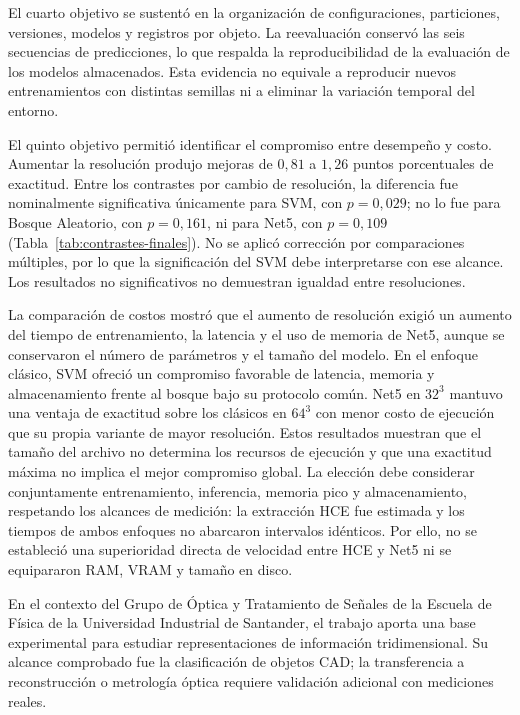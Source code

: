 El cuarto objetivo se sustentó en la organización de configuraciones, particiones, versiones, modelos y registros por objeto. La reevaluación conservó las seis secuencias de predicciones, lo que respalda la reproducibilidad de la evaluación de los modelos almacenados. Esta evidencia no equivale a reproducir nuevos entrenamientos con distintas semillas ni a eliminar la variación temporal del entorno.

El quinto objetivo permitió identificar el compromiso entre desempeño y costo. Aumentar la resolución produjo mejoras de $0{,}81$ a $1{,}26$ puntos porcentuales de exactitud. Entre los contrastes por cambio de resolución, la diferencia fue nominalmente significativa únicamente para SVM, con $p=0{,}029$; no lo fue para Bosque Aleatorio, con $p=0{,}161$, ni para Net5, con $p=0{,}109$ (Tabla~\ref{tab:contrastes-finales}). No se aplicó corrección por comparaciones múltiples, por lo que la significación del SVM debe interpretarse con ese alcance. Los resultados no significativos no demuestran igualdad entre resoluciones.

La comparación de costos mostró que el aumento de resolución exigió un aumento del tiempo de entrenamiento, la latencia y el uso de memoria de Net5, aunque se conservaron el número de parámetros y el tamaño del modelo. En el enfoque clásico, SVM ofreció un compromiso favorable de latencia, memoria y almacenamiento frente al bosque bajo su protocolo común. Net5 en $32^3$ mantuvo una ventaja de exactitud sobre los clásicos en $64^3$ con menor costo de ejecución que su propia variante de mayor resolución. Estos resultados muestran que el tamaño del archivo no determina los recursos de ejecución y que una exactitud máxima no implica el mejor compromiso global. La elección debe considerar conjuntamente entrenamiento, inferencia, memoria pico y almacenamiento, respetando los alcances de medición: la extracción HCE fue estimada y los tiempos de ambos enfoques no abarcaron intervalos idénticos. Por ello, no se estableció una superioridad directa de velocidad entre HCE y Net5 ni se equipararon RAM, VRAM y tamaño en disco.

En el contexto del Grupo de Óptica y Tratamiento de Señales de la Escuela de Física de la Universidad Industrial de Santander, el trabajo aporta una base experimental para estudiar representaciones de información tridimensional. Su alcance comprobado fue la clasificación de objetos CAD; la transferencia a reconstrucción o metrología óptica requiere validación adicional con mediciones reales.

